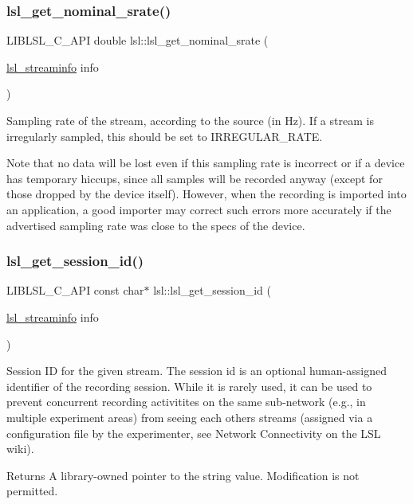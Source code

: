 \subsubsection{\texorpdfstring{lsl\+\_\+get\+\_\+nominal\+\_\+srate()}{lsl\_get\_nominal\_srate()}}
{\footnotesize\ttfamily L\+I\+B\+L\+S\+L\+\_\+\+C\+\_\+\+A\+PI double lsl\+::lsl\+\_\+get\+\_\+nominal\+\_\+srate (\begin{DoxyParamCaption}\item[{\hyperlink{namespacelsl_aa0a9ce9956061679949daa2e35aae2e8}{lsl\+\_\+streaminfo}}]{info }\end{DoxyParamCaption})}

Sampling rate of the stream, according to the source (in Hz). If a stream is irregularly sampled, this should be set to I\+R\+R\+E\+G\+U\+L\+A\+R\+\_\+\+R\+A\+TE.

Note that no data will be lost even if this sampling rate is incorrect or if a device has temporary hiccups, since all samples will be recorded anyway (except for those dropped by the device itself). However, when the recording is imported into an application, a good importer may correct such errors more accurately if the advertised sampling rate was close to the specs of the device. \mbox{\label{namespacelsl_ae28332bda70380cfd546fc158cd6f009}} 
\subsubsection{\texorpdfstring{lsl\+\_\+get\+\_\+session\+\_\+id()}{lsl\_get\_session\_id()}}
{\footnotesize\ttfamily L\+I\+B\+L\+S\+L\+\_\+\+C\+\_\+\+A\+PI const char$\ast$ lsl\+::lsl\+\_\+get\+\_\+session\+\_\+id (\begin{DoxyParamCaption}\item[{\hyperlink{namespacelsl_aa0a9ce9956061679949daa2e35aae2e8}{lsl\+\_\+streaminfo}}]{info }\end{DoxyParamCaption})}

Session ID for the given stream. The session id is an optional human-\/assigned identifier of the recording session. While it is rarely used, it can be used to prevent concurrent recording activitites on the same sub-\/network (e.\+g., in multiple experiment areas) from seeing each other\textquotesingle{}s streams (assigned via a configuration file by the experimenter, see Network Connectivity on the L\+SL wiki). \begin{DoxyReturn}{Returns}
A library-\/owned pointer to the string value. Modification is not permitted. 
\end{DoxyReturn}
\mbox{\label{namespacelsl_ad2987f3c32e0edae147498a8870a3215}} 
